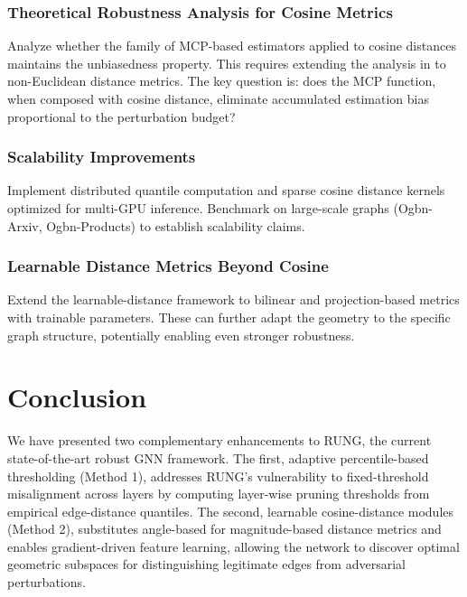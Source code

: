 \documentclass[sigconf]{acmart}
\begin{document}
\subsubsection{Theoretical Robustness Analysis for Cosine Metrics}

Analyze whether the family of MCP-based estimators applied to cosine distances maintains the unbiasedness property. This requires extending the analysis in \citet{hou2024rung} to non-Euclidean distance metrics. The key question is: does the MCP function, when composed with cosine distance, eliminate accumulated estimation bias proportional to the perturbation budget?

\subsubsection{Scalability Improvements}

Implement distributed quantile computation and sparse cosine distance kernels optimized for multi-GPU inference. Benchmark on large-scale graphs (Ogbn-Arxiv, Ogbn-Products) to establish scalability claims.

\subsubsection{Learnable Distance Metrics Beyond Cosine}

Extend the learnable-distance framework to bilinear and projection-based metrics with trainable parameters. These can further adapt the geometry to the specific graph structure, potentially enabling even stronger robustness.

\section{Conclusion}
We have presented two complementary enhancements to RUNG, the current state-of-the-art robust GNN framework. The first, adaptive percentile-based thresholding (Method 1), addresses RUNG's vulnerability to fixed-threshold misalignment across layers by computing layer-wise pruning thresholds from empirical edge-distance quantiles. The second, learnable cosine-distance modules (Method 2), substitutes angle-based for magnitude-based distance metrics and enables gradient-driven feature learning, allowing the network to discover optimal geometric subspaces for distinguishing legitimate edges from adversarial perturbations.
\end{document}
